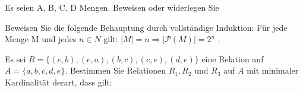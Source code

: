 \documentclass[10pt, a4paper]{exam}
\begin{document}
\begin{questions}

    \question Es seien A, B, C, D Mengen. Beweisen oder widerlegen Sie

    \question Beweisen Sie die folgende Behauptung durch vollständige Induktion: Für jede Menge M und jedes $n\in N$ gilt: $|M| = n\Rightarrow |\mathcal{P}(M)| = 2^n$ .
    \begin{solution}
    \end{solution}

    \question Es sei $R=\{(e, b), (e, a), (b, c), (c, e), (d, e)\}$ eine Relation auf $A=\{a, b, c, d, e\}$. Bestimmen Sie Relationen $R_1 , R_2$ und $R_3$ auf $A$ mit minimaler Kardinalität derart, dass gilt:
\end{questions}
\end{document}
